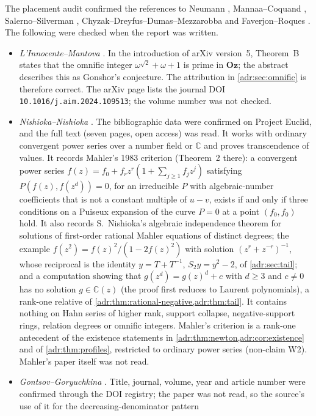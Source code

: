 \documentclass[11pt,letterpaper]{article}
\numberwithin{equation}{section}
\theoremstyle{definition}
\theoremstyle{remark}
\newcommand{\Oz}{\mathbf{Oz}}
\newcommand{\C}{\mathbb C}
\begin{document}
The placement audit confirmed the references to Neumann \cite{Neumann},
Mannaa--Coquand \cite{MC}, Salerno--Silverman \cite{SS},
Chyzak--Dreyfus--Dumas--Mezzarobba \cite{CDDM} and Faverjon--Roques
\cite{FR}. The following were checked when the report was written.
\begin{itemize}[leftmargin=*,itemsep=3pt]
\item \emph{L'Innocente--Mantova} \cite{LM}. In the introduction of arXiv
version~5, Theorem~B states that the omnific integer
$\omega^{\sqrt2}+\omega+1$ is prime in $\Oz$; the abstract describes this
as Gonshor's conjecture. The attribution in \cref{adr:sec:omnific} is
therefore correct. The arXiv page lists the journal DOI
\nolinkurl{10.1016/j.aim.2024.109513}; the volume number was not checked.
\item \emph{Nishioka--Nishioka} \cite{NN}. The bibliographic data were
confirmed on Project Euclid, and the full text (seven pages, open access)
was read. It works with ordinary convergent power series over a number
field or $\C$ and proves transcendence of values. It records Mahler's 1983
criterion \cite{Mahler83} (Theorem~2 there): a convergent power series
$f(z)=f_0+f_rz^r(1+\sum_{j\ge1}f_jz^j)$ satisfying $P(f(z),f(z^d))=0$, for
an irreducible $P$ with algebraic-number coefficients that is not a
constant multiple of $u-v$, exists if and only if three conditions on a
Puiseux expansion of the curve $P=0$ at a point $(f_0,f_0)$ hold.
It also records S.~Nishioka's algebraic independence theorem for solutions
of first-order rational Mahler equations of distinct degrees; the example
$f(z^2)=f(z)^2/(1-2f(z)^2)$ with solution $(z^r+z^{-r})^{-1}$, whose
reciprocal is the identity $y=T+T^{-1}$, $S_2y=y^2-2$, of
\cref{adr:sec:tail}; and a computation showing that
$g(z^d)=g(z)^d+c$ with $d\ge3$ and $c\ne0$ has no solution $g\in\C(z)$
(the proof first reduces to Laurent polynomials), a rank-one relative of
\cref{adr:thm:rational-negative,adr:thm:tail}. It
contains nothing on Hahn series of higher rank, support collapse,
negative-support rings, relation degrees or omnific integers. Mahler's
criterion is a rank-one antecedent of the existence statements in
\cref{adr:thm:newton,adr:cor:existence} and of \cref{adr:thm:profiles},
restricted to ordinary power series (non-claim W2). Mahler's paper itself
was not read.
\item \emph{Gontsov--Goryuchkina} \cite{GG}. Title, journal, volume, year
and article number were confirmed through the DOI registry; the paper was
not read, so the source's use of it for the decreasing-denominator pattern

\end{itemize}
\end{document}
